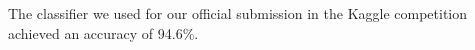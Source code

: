 \documentclass[twoside,11pt]{homework}
\begin{document}

The classifier we used for our official submission in the Kaggle competition achieved an accuracy of 94.6\%.
\end{document}
